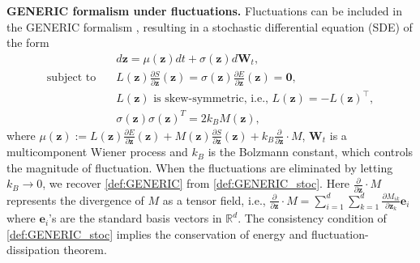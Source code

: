 \documentclass[openacc]{rsproca_new}%
\newcommand{\z}{\bm{z}}
\begin{document}
\textbf{GENERIC formalism under fluctuations.} 
Fluctuations can be included in the GENERIC formalism \cite{grmela1997dynamics,ottinger2005beyond},
resulting in a stochastic differential equation (SDE)
of the form
\begin{equation} \label{def:GENERIC_stoc}
    \begin{split}
    &d\z  
    = \mu(\z)dt + \sigma(\z)d\bm{W}_t,
    \\
    \text{subject to} 
    \quad
    &L(\z)\frac{\partial S}{\partial \z}(\z)
    =  \sigma(\z)\frac{\partial E}{\partial \z}(\z) = \bm{0},
    \\
    &
    L(\z) \text{ is skew-symmetric, i.e., } L(\z) = -L(\z)^\top, \\
    &
    \sigma(\z)\sigma(\z)^T = 2k_B M(\z),
    \end{split}
\end{equation}
where 
$\mu(\z) := L(\z)\frac{\partial E}{\partial \z}(\z) + M(\z)\frac{\partial S}{\partial \z}(\z)+k_B\frac{\partial}{\partial \z}\cdot M$,
$\bm{W}_t$ is a multicomponent Wiener process
and 
$k_B$ is the Bolzmann constant, which controls the magnitude of fluctuation. 
When the fluctuations are eliminated by letting $k_B\to 0$,
we recover 
\eqref{def:GENERIC} from \eqref{def:GENERIC_stoc}. 
Here $\frac{\partial}{\partial \z} \cdot M$ represents the divergence of $M$ as a tensor field, i.e.,
$\frac{\partial}{\partial \z} \cdot M = \sum_{i=1}^d\sum_{k=1}^d\frac{\partial M_{ik}}{\partial{\z_k}}\bm{e}_i$
where 
$\bm{e}_i$'s are the standard basis vectors 
in $\mathbb{R}^d$.
The consistency condition of \eqref{def:GENERIC_stoc}
implies the conservation of energy and fluctuation-dissipation theorem.
\end{document}
